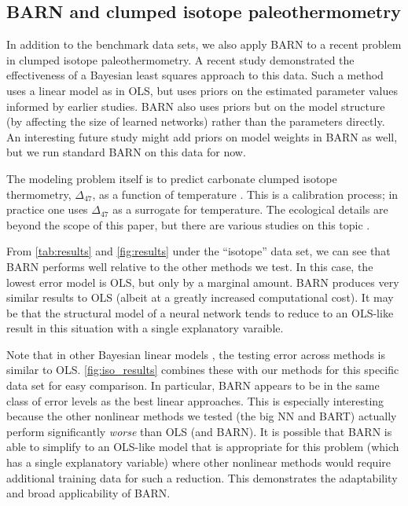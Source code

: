 \documentclass[12pt]{article}
\begin{document}
\subsection{BARN and clumped isotope paleothermometry}\label{subsec:therm}

In addition to the benchmark data sets, we also apply BARN to a recent problem in clumped isotope paleothermometry.  A recent study \cite{roman2022bayclump} demonstrated the effectiveness of a Bayesian least squares approach to this data.  Such a method uses a linear model as in OLS, but uses priors on the estimated parameter values informed by earlier studies.  BARN also uses priors but on the model structure (by affecting the size of learned networks) rather than the parameters directly.  An interesting future study might add priors on model weights in BARN as well, but we run standard BARN on this data for now.

The modeling problem itself is to predict carbonate clumped isotope thermometry, $\Delta_{47}$, as a function of temperature \cite{eiler200418o13c16o}.  This is a calibration process; in practice one uses $\Delta_{47}$ as a surrogate for temperature.  The ecological details are beyond the scope of this paper, but there are various studies on this topic \cite{eiler200418o13c16o,roman2022bayclump,petersen2019effects}.

From \autoref{tab:results} and \autoref{fig:results} under the ``isotope'' data set, we can see that BARN performs well relative to the other methods we test.  In this case, the lowest error model is OLS, but only by a marginal amount.  BARN produces very similar results to OLS (albeit at a greatly increased computational cost).  It may be that the structural model of a neural network tends to reduce to an OLS-like result in this situation with a single explanatory varaible.

Note that in other Bayesian linear models \cite{roman2022bayclump}, the testing error across methods is similar to OLS.  \autoref{fig:iso_results} combines these with our methods for this specific data set for easy comparison.  In particular, BARN appears to be in the same class of error levels as the best linear approaches.  This is especially interesting because the other nonlinear methods we tested (the big NN and BART) actually perform significantly \emph{worse} than OLS (and BARN).  It is possible that BARN is able to simplify to an OLS-like model that is appropriate for this problem (which has a single explanatory variable) where other nonlinear methods would require additional training data for such a reduction.  This demonstrates the adaptability and broad applicability of BARN.
\end{document}
